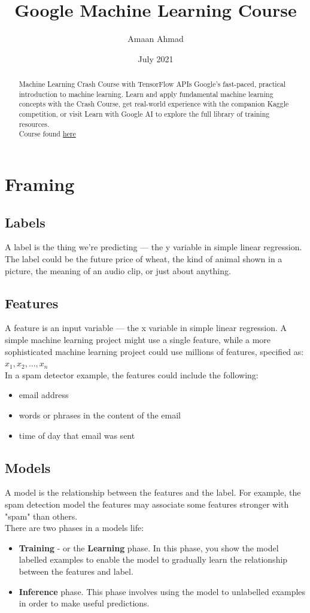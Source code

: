\documentclass[12pt]{article}
\title{\textbf{\Huge Google Machine Learning Course}}
\date{\Large July 2021}
\author{\LARGE Amaan Ahmad}
\begin{document}
\maketitle
\begin{abstract}
\begin{center}
	Machine Learning Crash Course with TensorFlow APIs Google's fast-paced, practical introduction to machine learning. Learn and apply fundamental machine learning concepts with the Crash Course, get real-world experience with the companion Kaggle competition, or visit Learn with Google AI to explore the full library of training resources.\\
	Course found \href{https://developers.google.com/machine-learning/crash-course}{here}
\end{center}

\end{abstract}
\newpage
\tableofcontents
\newpage
\section{Framing}
\subsection{Labels}
A label is the thing we're predicting — the y variable in simple linear regression. The label could be the future price of wheat, the kind of animal shown in a picture, the meaning of an audio clip, or just about anything.
\subsection{Features}
A feature is an input variable — the x variable in simple linear regression. A simple machine learning project might use a single feature, while a more sophisticated machine learning project could use millions of features, specified as: $x_1, x_2,...,x_n$
\\ In a spam detector example, the features could include the following:
	\begin{itemize}
		\item email address
		\item words or phrases in the content of the email
		\item time of day that email was sent
	\end{itemize}
\subsection{Models}
A model is the relationship between the features and the label. For example, the spam detection model the features may associate some features stronger with "spam" than others.
\\There are two phases in a models life:
	\begin{itemize}
		\item \textbf{Training} - or the \textbf{Learning} phase. In this phase, you show the model labelled examples to enable the model to gradually learn the relationship between the features and label.
		\item \textbf{Inference} phase. This phase involves using the model to unlabelled examples in order to make useful predictions.
	\end{itemize}
\end{document}
